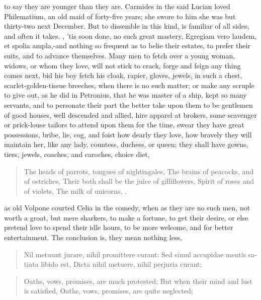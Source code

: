 to say they are younger than they are. Carmides in the said Lucian
loved Philematium, an old maid of forty-five years; she swore to
him she was but thirty-two next December. But to dissemble in this
kind, is familiar of all sides, and often it takes. , 'tis soon done, no such great
mastery, Egregiam vero laudem, et spolia ampla,-and nothing so frequent
as to belie their estates, to prefer their suits, and to advance
themselves. Many men to fetch over a young woman, widows, or whom they
love, will not stick to crack, forge and feign any thing comes next,
bid his boy fetch his cloak, rapier, gloves, jewels, \etc{} in such a
chest, scarlet-golden-tissue breeches, \etc{} when there is no such
matter; or make any scruple to give out, as he did in Petronius, that
he was master of a ship, kept so many servants, and to personate their
part the better take upon them to be gentlemen of good houses, well
descended and allied, hire apparel at brokers, some scavenger or
prick-louse tailors to attend upon them for the time, swear they have
great possessions, bribe, lie, cog, and foist how dearly they
love, how bravely they will maintain her, like any lady, countess,
duchess, or queen; they shall have gowns, tiers, jewels, coaches, and
caroches, choice diet,

\begin{verse}%
The heads of parrots, tongues of nightingales,
The brains of peacocks, and of ostriches,
Their bath shall be the juice of gilliflowers,
Spirit of roses and of violets,
The milk of unicorns, \etc{}.
\end{verse}%

as old Volpone courted Celia in the comedy, when as they are no
such men, not worth a groat, but mere sharkers, to make a fortune, to
get their desire, or else pretend love to spend their idle hours, to be
more welcome, and for better entertainment. The conclusion is, they
mean nothing less,

\begin{latin}
\begin{verse}
Nil metuunt jurare, nihil promittere curant:
Sed simul accupidae mentis satiata libido est,
Dicta nihil metuere, nihil perjuria curant;
\end{verse}
\end{latin}
\translationrule%
\begin{verse}%
Oaths, vows, promises, are much protested;
But when their mind and lust is satisfied,
Oaths, vows, promises, are quite neglected;
\end{verse}%

